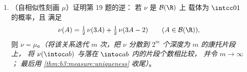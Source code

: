 \begin{problem}
\begin{enumerate}[resume]
\[        \mu\bigl(\intcc{x - r}{x + r}\bigr) \leq 8\,r^{s} .
        \]
        \emph{（将深度为 $m$ 的三分网格与 $\abs{x - y}$
        的尺度作比较；第 18 题给出每个片段上的升高。
        指数 $s$ 为豪斯多夫维数，
        亦即 $C$ 的维数，后续课程将予以说明。）}
  \item （自相似性刻画 $\mu$）证明第 19 题的逆：
        若 $\nu$ 是 $\mathcal B(\R)$ 上
        载体为 $\intcc01$ 的概率，且
        满足
        \[
        \nu(A) = \tfrac12\,\nu(3A) + \tfrac12\,\nu(3A - 2)
        \qquad (A \in \mathcal B(\R)),
        \]
        则 $\nu = \mu$。\emph{（将该关系迭代 $m$
        次，把 $\nu$ 分散到 $2^m$ 个深度为 $m$ 的康托片段上，
        将 $\nu(\intoc ab)$ 与落在 $\intoc ab$ 内的片段个数相比较，
        并令 $m \to \infty$；
        最后用 \cref{thm:b3:measure:uniqueness} 收尾）}。
\end{enumerate}
\end{problem}
